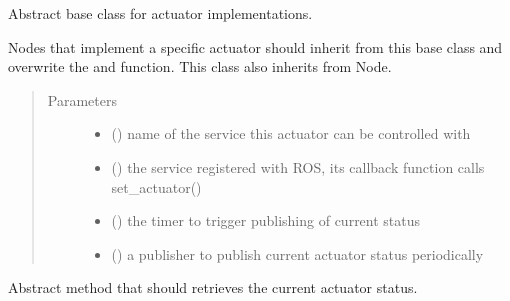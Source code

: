 \documentclass[a4paper,12pt,english]{article}
\begin{document}
\begin{fulllineitems}
\label{\detokenize{osbk_devices:osbk_devices.actuator_base.ActuatorBase}}
Abstract base class for actuator implementations.

Nodes that implement a specific actuator should inherit from this base class and overwrite the
 and  function. This class also inherits from Node.
\begin{quote}\begin{description}
\item[{Parameters}] \leavevmode\begin{itemize}
\item {} 
 () \textendash{} name of the service this actuator can be
controlled with

\item {} 
 () \textendash{} the service registered with ROS, its callback function calls
set\_actuator()

\item {} 
 () \textendash{} the timer to trigger publishing of current status

\item {} 
 () \textendash{} a publisher to publish current actuator status periodically

\end{itemize}

\end{description}\end{quote}

\begin{fulllineitems}
\label{\detokenize{osbk_devices:osbk_devices.actuator_base.ActuatorBase.poll_status}}
Abstract method that should retrieves the current actuator status.


\end{fulllineitems}
\end{fulllineitems}
\end{document}
